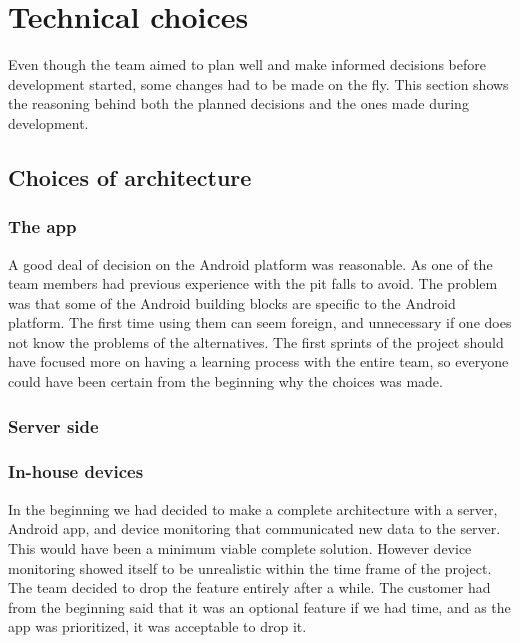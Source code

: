 \section{Technical choices}
Even though the team aimed to plan well and make informed decisions before development started, some changes had to be made on the fly. This section shows the reasoning behind both the planned decisions and the ones made during development.

\subsection{Choices of architecture}

\subsubsection{The app}

A good deal of decision on the Android platform was reasonable. As one of the team members had previous experience with the pit falls to avoid. The problem was that some of the Android building blocks are specific to the Android platform. The first time using them can seem foreign, and unnecessary if one does not know the problems of the alternatives. The first sprints of the project should have focused more on having a learning process with the entire team, so everyone could have been certain from the beginning why the choices was made.

\subsubsection{Server side}


\subsubsection{In-house devices}

In the beginning we had decided to make a complete architecture with a server, Android app, and device monitoring that communicated new data to the server. This would have been a minimum viable complete solution. However device monitoring showed itself to be unrealistic within the time frame of the project. The team decided to drop the feature entirely after a while. The customer had from the beginning said that it was an optional feature if we had time, and as the app was prioritized, it was acceptable to drop it.

